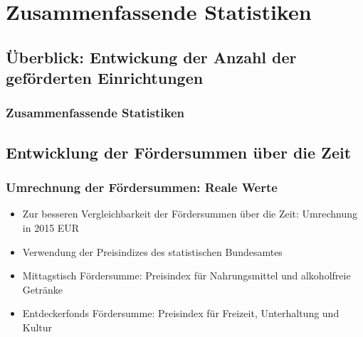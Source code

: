 \section{Zusammenfassende Statistiken}

\subsection{Überblick: Entwickung der Anzahl der geförderten Einrichtungen}


\begin{frame}[fragile]
\frametitle{Zusammenfassende Statistiken}
\begin{table}[ht]
\centering
{}
\caption{Zusammenfassende Statistiken} 
\label{fundamentalDynamics}
\end{table}

\end{frame}

\subsection{Entwicklung der Fördersummen über die Zeit}

\begin{frame}[fragile]
\frametitle{Umrechnung der Fördersummen: Reale Werte}
\begin{itemize}
  \item{Zur besseren Vergleichbarkeit der Fördersummen über die Zeit: Umrechnung in 2015 EUR}
  \item{Verwendung der Preisindizes des statistischen Bundesamtes}
  \item{Mittagstisch Fördersumme: Preisindex für Nahrungsmittel und alkoholfreie Getränke}
  \item{Entdeckerfonds Fördersumme: Preisindex für Freizeit, Unterhaltung und Kultur}
\end{itemize}
\end{frame}

